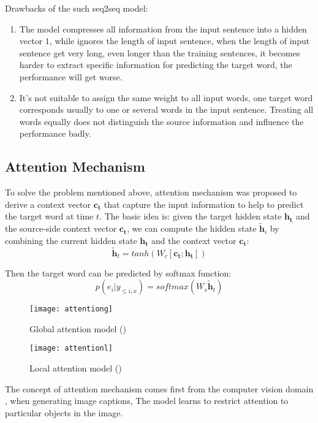 %
%

Drawbacks of the such seq2seq model:
\begin{enumerate}
	\item The model compresses all information from the input sentence into a hidden vector ${1}$, while ignores the length of input sentence, when the length of input sentence get very long, even longer than the training sentences, it becomes harder to extract specific information for predicting the target word, the performance will get worse.
	\item It's not suitable to assign the same weight to all input words, one target word corresponds usually to one or several words in the input sentence. Treating all words equally does not distinguish the source information and influence the performance badly.
\end{enumerate}

\subsection{Attention Mechanism}
To solve the problem mentioned above, attention mechanism was proposed to derive a context vector ${\bm{c_t}}$ that capture the input information to help to predict the target word at time ${t}$. The basic idea is: given the target hidden state ${\bm{h_t}}$ and the source-side context vector $\bm{c_t}$, we can compute the hidden state ${\tilde{\bm{h}}_i}$ by combining the current hidden state $\bm{h_t}$ and the context vector $\bm{c_t}$:
\[ \tilde{\bm{h}}_t = tanh(W_c[\bm{c_t}; \bm{h_t}])\]

Then the target word can be predicted by softmax function:
\[ p(e_i| y_{\le i, x}) = softmax(W_s \tilde{\bm{h}}_t)\] 

\begin{figure}[t]
	\texttt{[image: attentiong]}
	\caption{Global attention model (\cite{luong2015effective})}
	\centering
\end{figure}

\begin{figure}[t]
	\texttt{[image: attentionl]}
	\caption{Local attention model (\cite{luong2015effective})}
	\centering
\end{figure}
The concept of attention mechanism comes first from the computer vision domain \cite{xu2015show}, when generating image captions,  The model learns to restrict attention to particular objects in the image.

